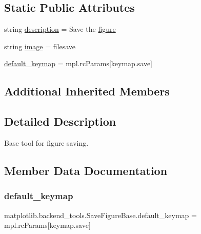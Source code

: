 \subsection*{Static Public Attributes}
\begin{DoxyCompactItemize}
\item 
string \hyperlink{classmatplotlib_1_1backend__tools_1_1SaveFigureBase_a241929f8ea3dba74d228268586437162}{description} = \textquotesingle{}Save the \hyperlink{classmatplotlib_1_1backend__tools_1_1ToolBase_af85e83d1db0787aa40d06837204651ee}{figure}\textquotesingle{}
\item 
string \hyperlink{classmatplotlib_1_1backend__tools_1_1SaveFigureBase_a53fd838ede585a1a98812d1ee5ac45cd}{image} = \textquotesingle{}filesave\textquotesingle{}
\item 
\hyperlink{classmatplotlib_1_1backend__tools_1_1SaveFigureBase_a8a8522609473790a451efd8078b4fcef}{default\+\_\+keymap} = mpl.\+rc\+Params\mbox{[}\textquotesingle{}keymap.\+save\textquotesingle{}\mbox{]}
\end{DoxyCompactItemize}
\subsection*{Additional Inherited Members}


\subsection{Detailed Description}
\begin{DoxyVerb}Base tool for figure saving.\end{DoxyVerb}
 

\subsection{Member Data Documentation}
\mbox{\label{classmatplotlib_1_1backend__tools_1_1SaveFigureBase_a8a8522609473790a451efd8078b4fcef}} 
\subsubsection{\texorpdfstring{default\+\_\+keymap}{default\_keymap}}
{\footnotesize\ttfamily matplotlib.\+backend\+\_\+tools.\+Save\+Figure\+Base.\+default\+\_\+keymap = mpl.\+rc\+Params\mbox{[}\textquotesingle{}keymap.\+save\textquotesingle{}\mbox{]}\hspace{0.3cm}{\ttfamily [static]}}

